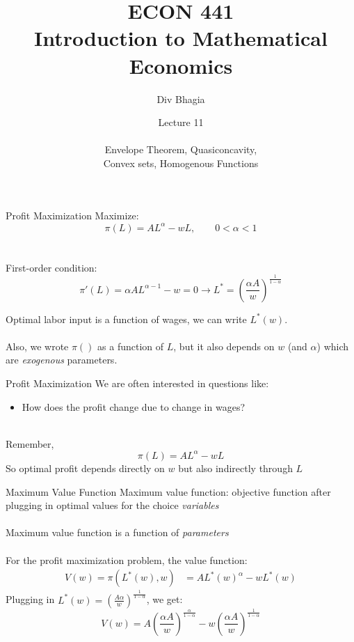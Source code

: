 \documentclass{./../../Latex/teaching_slides}
\begin{document}
\title{ECON 441 \\ \vspace{0.4em} \normalsize Introduction to Mathematical Economics}
\author{Div Bhagia}
\date{Lecture 11 \\~\\ Envelope Theorem, Quasiconcavity, \\
Convex sets, Homogenous Functions}

\begin{frame}
\maketitle
\end{frame}

\begin{frame}{Profit Maximization}
Maximize:
$$ \pi(L) = AL^{\alpha}-wL, \quad \quad 0 < \alpha <1 $$ \\~\\

First-order condition:
$$ \pi'(L) = \alpha A L^{\alpha-1}-w = 0 \rightarrow L^* = \left(\frac{\alpha A}{w}\right)^{\frac{1}{1-\alpha}} $$


Optimal labor input is a function of wages, we can write $L^*(w)$. \\~\\
Also, we wrote $\pi()$ as a function of $L$, but it also depends on $w$ (and $\alpha$) which are \textit{exogenous} parameters.
\end{frame}

\begin{frame}{Profit Maximization}
We are often interested in questions like: \\
\begin{itemize}
  \item[] How does the profit change due to change in wages? \\~\\
\end{itemize}
Remember, $$ \pi(L) = A L^{\alpha}-wL$$
So optimal profit depends directly on $w$ but also indirectly through $L$
\end{frame}


\begin{frame}{Maximum Value Function}
Maximum value function: objective function after plugging in optimal values for the choice \textit{variables} \\~\\

Maximum value function is a function of \textit{parameters} \\~\\
For the profit maximization problem, the value function:
\begin{align*}
	 V(w) = \pi(L^*(w), w) &= A L^*(w)^{\alpha}-wL^*(w) 
\end{align*}
Plugging in $L^*(w) = \left(\frac{A \alpha}{w}\right)^{\frac{1}{1-\alpha}}$, we get:
$$ V(w)  = A\left(\frac{\alpha A}{w}\right)^{\frac{\alpha}{1-\alpha}}-w \left(\frac{\alpha A}{w}\right)^{\frac{1}{1-\alpha}} $$


\end{frame}
\end{document}
